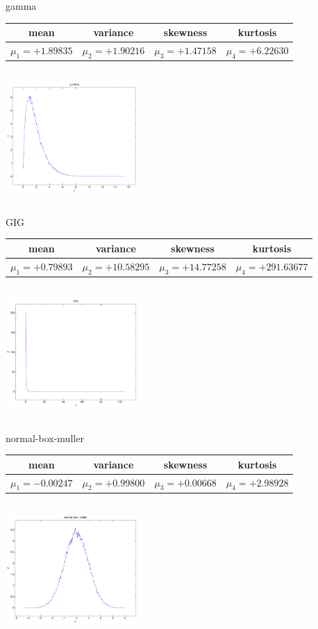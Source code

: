 \documentclass[9pt]{article}
\theoremstyle{plain}
\theoremstyle{definition}
\theoremstyle{remark}
\numberwithin{equation}{section}
\begin{document}
\newpage
gamma \begin{tabular}{|c|c|c|c|}  mean & variance & skewness & kurtosis \\  \hline
$\mu_1 = +1.89835$ & $\mu_2 = +1.90216$ & $\mu_3 = +1.47158$ & $\mu_4 =+6.22630$ \\
\end{tabular}

\includegraphics[width=5cm,height=5cm]{gamma.pdf}

GIG \begin{tabular}{|c|c|c|c|}  mean & variance & skewness & kurtosis \\  \hline
$\mu_1 = +0.79893$ & $\mu_2 = +10.58295$ & $\mu_3 = +14.77258$ & $\mu_4 =+291.63677$ \\
\end{tabular}

\includegraphics[width=5cm,height=5cm]{GIG.pdf}

normal-box-muller \begin{tabular}{|c|c|c|c|}  mean & variance & skewness & kurtosis \\  \hline
$\mu_1 = -0.00247$ & $\mu_2 = +0.99800$ & $\mu_3 = +0.00668$ & $\mu_4 =+2.98928$ \\
\end{tabular}

\includegraphics[width=5cm,height=5cm]{normal-box-muller.pdf}
\end{document}
